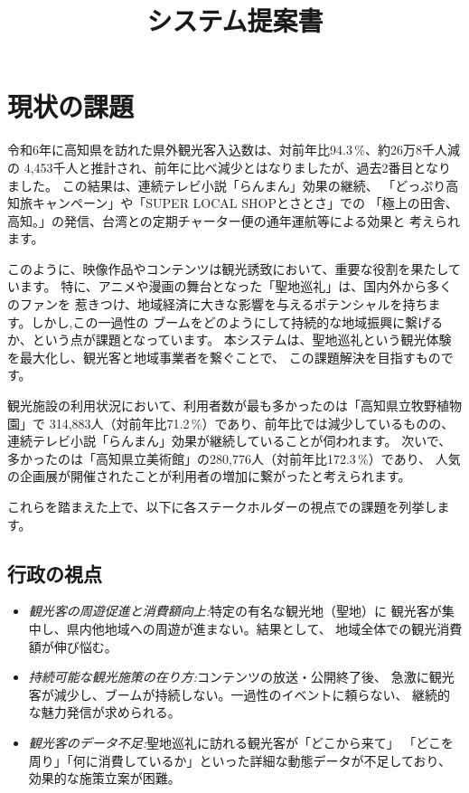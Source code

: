 \documentclass{docs}
\title{システム提案書}
\begin{document}
\section{現状の課題}
令和6年に高知県を訪れた県外観光客入込数は、対前年比94.3\,\%、約26万8千人減の
4,453千人と推計され、前年に比べ減少とはなりましたが、過去2番目となりました。
この結果は、連続テレビ小説「らんまん」効果の継続、
「どっぷり高知旅キャンペーン」や「SUPER LOCAL SHOPとさとさ」での
「極上の田舎、高知。」の発信、台湾との定期チャーター便の通年運航等による効果と
考えられます。

このように、映像作品やコンテンツは観光誘致において、重要な役割を果たしています。
特に、アニメや漫画の舞台となった「聖地巡礼」は、国内外から多くのファンを
惹きつけ、地域経済に大きな影響を与えるポテンシャルを持ちます。しかし,この一過性の
ブームをどのようにして持続的な地域振興に繋げるか、という点が課題となっています。
本システムは、聖地巡礼という観光体験を最大化し、観光客と地域事業者を繋ぐことで、
この課題解決を目指すものです。

観光施設の利用状況において、利用者数が最も多かったのは「高知県立牧野植物園」で
314,883人（対前年比71.2\,\%）であり、前年比では減少しているものの、
連続テレビ小説「らんまん」効果が継続していることが伺われます。
次いで、多かったのは「高知県立美術館」の280,776人（対前年比172.3\,\%）であり、
人気の企画展が開催されたことが利用者の増加に繋がったと考えられます。

これらを踏まえた上で、以下に各ステークホルダーの視点での課題を列挙します。
\subsection{行政の視点}
\begin{itemize}
	\item \emph{観光客の周遊促進と消費額向上:}特定の有名な観光地（聖地）に
	観光客が集中し、県内他地域への周遊が進まない。結果として、
	地域全体での観光消費額が伸び悩む。
	\item \emph{持続可能な観光施策の在り方:}コンテンツの放送・公開終了後、
	急激に観光客が減少し、ブームが持続しない。一過性のイベントに頼らない、
	継続的な魅力発信が求められる。
	\item \emph{観光客のデータ不足:}聖地巡礼に訪れる観光客が「どこから来て」
	「どこを周り」「何に消費しているか」といった詳細な動態データが不足しており、
	効果的な施策立案が困難。
\end{itemize}
\end{document}
